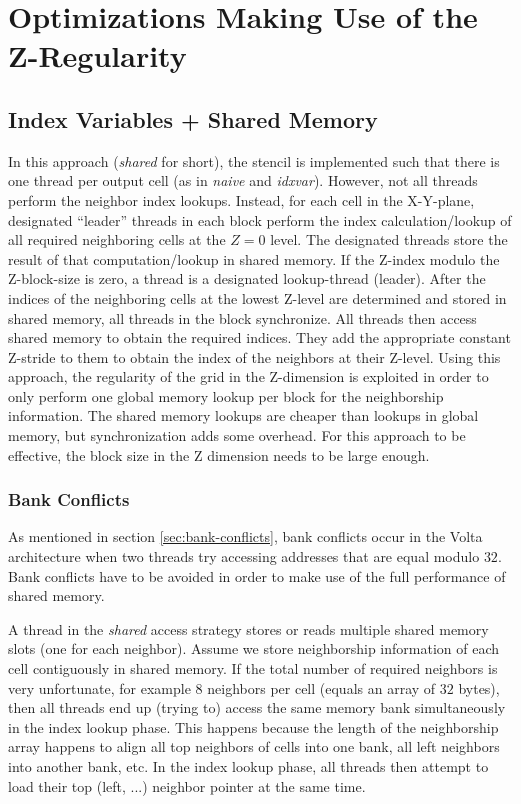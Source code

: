 \section{Optimizations Making Use of the Z-Regularity}

\subsection{Index Variables + Shared Memory} In this approach (\emph{shared} for short), the stencil is implemented such that there is one thread per output cell (as in \emph{naive} and \emph{idxvar}). However, not all threads perform the neighbor index lookups. Instead, for each cell in the X-Y-plane, designated ``leader'' threads in each block perform the index calculation/lookup of all required neighboring cells at the $Z=0$ level. The designated threads store the result of that computation/lookup in shared memory. If the Z-index modulo the Z-block-size is zero, a thread is a designated lookup-thread (leader). After the indices of the neighboring cells at the lowest Z-level are determined and stored in shared memory, all threads in the block synchronize. All threads then access shared memory to obtain the required indices. They add the appropriate constant Z-stride to them to obtain the index of the neighbors at their Z-level. Using this approach, the regularity of the grid in the Z-dimension is exploited in order to only perform one global memory lookup per block for the neighborship information. The shared memory lookups are cheaper than lookups in global memory, but synchronization adds some overhead. For this approach to be effective, the block size in the Z dimension needs to be large enough.

\subsubsection{Bank Conflicts}

As mentioned in section \ref{sec:bank-conflicts}, bank conflicts occur in the Volta architecture when two threads try accessing addresses that are equal modulo $32$. Bank conflicts have to be avoided in order to make use of the full performance of shared memory.

A thread in the \emph{shared} access strategy stores or reads multiple shared memory slots (one for each neighbor). Assume we store neighborship information of each cell contiguously in shared memory. If the total number of required neighbors is very unfortunate, for example $8$ neighbors per cell (equals an array of $32$ bytes), then all threads end up (trying to) access the same memory bank simultaneously in the index lookup phase. This happens because the length of the neighborship array happens to align all top neighbors of cells into one bank, all left neighbors into another bank, etc. In the index lookup phase, all threads then attempt to load their top (left, ...) neighbor pointer at the same time.

